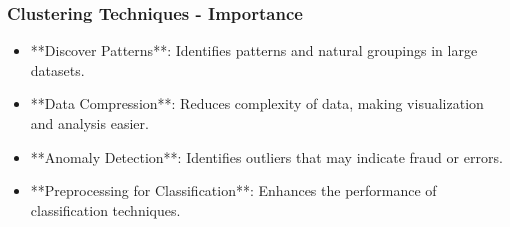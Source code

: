\documentclass[aspectratio=169]{beamer}
\begin{document}
\begin{frame}[fragile]
    \frametitle{Clustering Techniques - Importance}
    \begin{itemize}
        \item **Discover Patterns**: Identifies patterns and natural groupings in large datasets.
        \item **Data Compression**: Reduces complexity of data, making visualization and analysis easier.
        \item **Anomaly Detection**: Identifies outliers that may indicate fraud or errors.
        \item **Preprocessing for Classification**: Enhances the performance of classification techniques.
    \end{itemize}
\end{frame}
\end{document}
